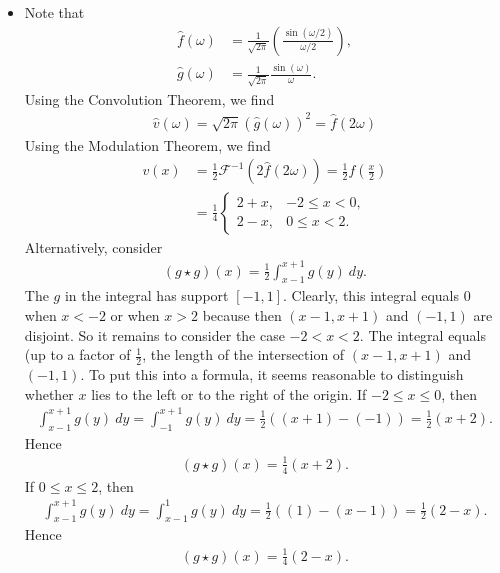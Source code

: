 \documentclass[11pt]{article}
\begin{document}
\begin{solution}
\begin{itemize}
        
        \item 
        Note that
        \begin{align*}
            \hat{f}(\omega) &= \frac{1}{\sqrt{2 \pi}} \left(\frac{\sin(\omega / 2)}{\omega / 2}\right),
            \\
            \hat{g}(\omega) &= \frac{1}{\sqrt{2 \pi}} \frac{\sin(\omega)}{\omega}.
        \end{align*}
        Using the Convolution Theorem, we find
        \begin{align*}
            \hat{v}(\omega) = \sqrt{2 \pi}(\hat g (\omega))^2 = \hat f(2 \omega)
        \end{align*}
        Using the Modulation Theorem, we find
        \begin{align*}
            v(x) &= \frac 1 2 \mathcal{F}^{-1}(2 \hat f(2 \omega)) = \frac 1 2 f(\frac x 2)\\
                &= \frac 1 4 \begin{cases}
                    2 + x,& -2 \leq x < 0,\\
                    2 - x,& 0 \leq x < 2.
                \end{cases}
        \end{align*}
        Alternatively, consider 
        \begin{align*}
            ( g \star g )(x) = \frac 1 2 \int_{x-1}^{x+1} g(y) \ dy.
        \end{align*}
        The $g$ in the integral has support $[-1,1]$. 
        Clearly, this integral equals $0$ when $x < -2$ or when $x > 2$ because then $(x-1,x+1)$ and $(-1,1)$ are disjoint. 
        So it remains to consider the case $-2 < x < 2$.
        The integral equals (up to a factor of $\tfrac 1 2$, the length of the intersection of $(x-1,x+1)$ and $(-1,1)$. 
        To put this into a formula, it seems reasonable to distinguish whether $x$ lies to the left or to the right of the origin.
        If $-2 \leq x \leq 0$, then 
        \begin{align*}
            \int_{x-1}^{x+1} g(y) \ dy = \int_{-1}^{x+1} g(y) \ dy = \frac 1 2 ( (x+1) - (-1) ) = \frac 1 2 ( x + 2 ).
        \end{align*}
        Hence 
        \begin{align*}
            ( g \star g )(x) = \frac 1 4 ( x + 2 ).
        \end{align*}
        If $0 \leq x \leq 2$, then 
        \begin{align*}
            \int_{x-1}^{x+1} g(y) \ dy = \int_{x-1}^{1} g(y) \ dy = \frac 1 2 ( (1) - (x-1) ) = \frac 1 2 ( 2 - x ).
        \end{align*}
        Hence 
        \begin{align*}
            ( g \star g )(x) = \frac 1 4 ( 2 - x ).
        \end{align*}
        

\end{itemize}
\end{solution}
\end{document}
